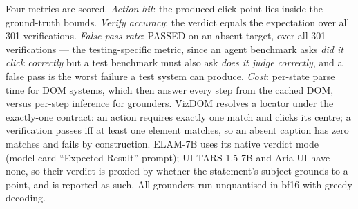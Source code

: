 \documentclass[11pt,a4paper]{article}
\begin{document}
Four metrics are scored. \emph{Action-hit}: the produced click point lies inside
the ground-truth bounds. \emph{Verify accuracy}: the verdict equals the expectation
over all 301 verifications. \emph{False-pass rate}: PASSED on an absent target, over
all 301 verifications --- the testing-specific metric, since an agent benchmark asks
\emph{did it click correctly} but a test benchmark must also ask \emph{does it judge
correctly}, and a false pass is the worst failure a test system can produce.
\emph{Cost}: per-state parse time for DOM systems, which then answer every step
from the cached DOM, versus per-step inference for grounders. VizDOM resolves a
locator under the exactly-one contract: an action requires exactly one match and
clicks its centre; a verification passes iff at least one element matches, so an
absent caption has zero matches and fails by construction. ELAM-7B uses its native
verdict mode (model-card ``Expected Result'' prompt); UI-TARS-1.5-7B and Aria-UI
have none, so their verdict is proxied by whether the statement's subject grounds to
a point, and is reported as such. All grounders run unquantised in bf16 with greedy
decoding.
\end{document}
